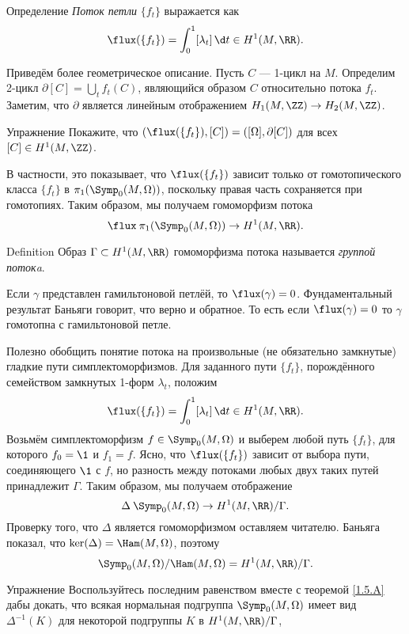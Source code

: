 \begin{ex*}{Определение}
\emph{Поток петли} $\{f_t\}$ выражается как 
\[\flux(\{f_t\}) = \int_0^1 [\lambda_t]\,\d t \in H^1(M, \RR).\]
\end{ex*}

Приведём более геометрическое описание.
Пусть $C$ --- 1-цикл на $M$.
Определим 2-цикл $\partial[C] = \bigcup_t f_t(C)$, являющийся образом $C$ относительно потока $f_t$.
Заметим, что $\partial$ является линейным отображением $H_1(M,\ZZ)\to H_2(M,\ZZ)$.

\begin{ex*}{Упражнение}
Покажите, что $(\flux(\{f_t\}), [C]) = ([\Omega], \partial[C])$ для всех $[C]\in H^1(M,\ZZ)$.
\end{ex*}

В частности, это показывает, что $\flux(\{f_t\})$ зависит только от гомотопического класса $\{f_t\}$ в $\pi_1 (\Symp_0(M,\Omega))$, поскольку правая часть сохраняется при гомотопиях.
Таким образом, мы получаем гомоморфизм потока
\[\flux\:\pi_1(\Symp_0(M,\Omega))\to H^1(M,\RR).\]

\begin{ex*}{Definition}
Образ $\Gamma \subset H^1(M, \RR)$ гомоморфизма потока называется \emph{группой потокa}.
\end{ex*}


Если $\gamma$ представлен гамильтоновой петлёй, то $\flux(\gamma) = 0$.
Фундаментальный результат Баньяги \cite{B1} говорит, что верно и обратное.
То есть если $\flux(\gamma) = 0$ то $\gamma$ гомотопна с гамильтоновой петле.

Полезно обобщить понятие потока на произвольные (не обязательно замкнутые) гладкие пути симплектоморфизмов.
Для заданного пути $\{f_t\}$, порождённого семейством замкнутых 1-форм $\lambda_t$, положим 
\[\flux(\{f_t\})=\int_0^1[\lambda_t]\,\d t\in H^1(M,\RR).\]
Возьмём симплектоморфизм $f \in \Symp_0(M,\Omega)$ и выберем любой путь $\{f_t\}$, для которого $f_0 = \1$ и $f_1 = f$.
Ясно, что $\flux (\{f_t\})$ зависит от выбора пути, соединяющего $\1$ с $f$, но разность между потоками любых двух таких путей принадлежит $\Gamma$.
Таким образом, мы получаем отображение
\[\Delta\:\Symp_0(M,\Omega)\to H^1(M,\RR)/\Gamma.\]
Проверку того, что $\Delta$ является гомоморфизмом оставляем читателю.
Баньяга показал, что $\ker(\Delta) = \Ham(M,\Omega)$, поэтому 
\[\Symp_0(M,\Omega)/\Ham(M,\Omega) = H^1(M, \RR)/\Gamma.\]

\begin{ex}{Упражнение}\label{14.1.B}
Воспользуйтесь последним равенством вместе с теоремой \ref{1.5.A} дабы докать, что всякая нормальная подгруппа $\Symp_0(M,\Omega)$ имеет вид $\Delta^{-1}(K)$ для некоторой подгруппы $K$ в $H^1(M, \RR)/\Gamma$,
\end{ex}

